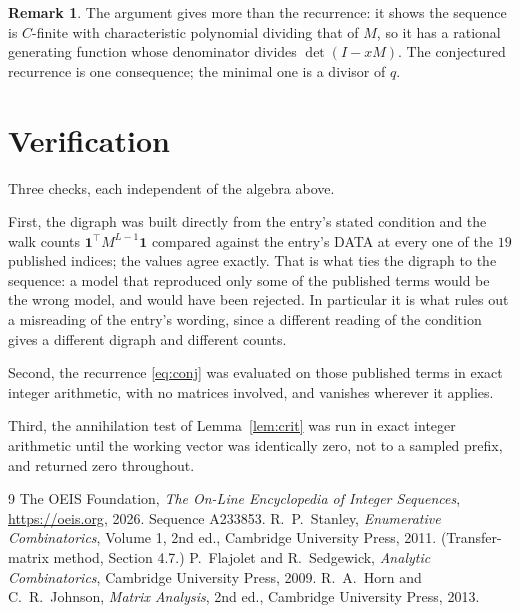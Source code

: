 \documentclass[11pt,a4paper]{article}
\theoremstyle{plain}
\theoremstyle{definition}
\newtheorem{remark}[theorem]{Remark}
\begin{document}
\begin{remark}
The argument gives more than the recurrence: it shows the sequence is $C$-finite with
characteristic polynomial dividing that of $M$, so it has a rational generating function
whose denominator divides $\det(I-xM)$. The conjectured recurrence is one consequence; the
minimal one is a divisor of $q$.
\end{remark}

\section{Verification}

Three checks, each independent of the algebra above.

First, the digraph was built directly from the entry's stated condition and the walk counts
$\mathbf{1}^{\!\top}M^{L-1}\mathbf{1}$ compared against the entry's DATA at
every one of the $19$ published indices; the values agree exactly. That is what ties
the digraph to the sequence: a model that reproduced only some of the published terms would
be the wrong model, and would have been rejected. In particular it is what rules out a
misreading of the entry's wording, since a different reading of the condition gives a
different digraph and different counts.

Second, the recurrence \eqref{eq:conj} was evaluated on those published terms in exact
integer arithmetic, with no matrices involved, and vanishes wherever it applies.

Third, the annihilation test of Lemma~\ref{lem:crit} was run in exact integer arithmetic
until the working vector was identically zero, not to a sampled prefix, and returned zero
throughout.

\begin{thebibliography}{9}
 The OEIS Foundation, \emph{The On-Line Encyclopedia of Integer
Sequences}, \url{https://oeis.org}, 2026. Sequence A233853.
 R.~P.~Stanley, \emph{Enumerative Combinatorics}, Volume 1, 2nd ed.,
Cambridge University Press, 2011. (Transfer-matrix method, Section 4.7.)
 P.~Flajolet and R.~Sedgewick, \emph{Analytic Combinatorics}, Cambridge
University Press, 2009.
 R.~A.~Horn and C.~R.~Johnson, \emph{Matrix Analysis}, 2nd ed., Cambridge
University Press, 2013.
\end{thebibliography}
\end{document}
